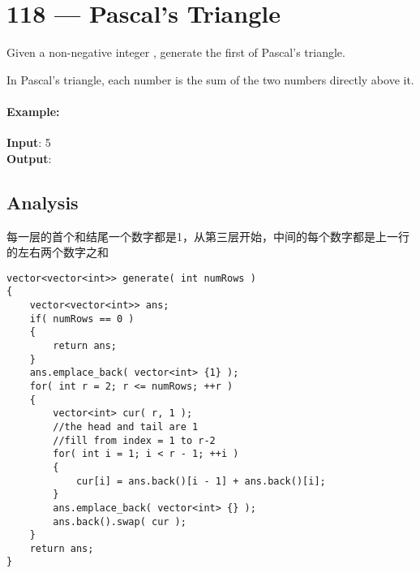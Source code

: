 \section{118 --- Pascal's Triangle}
Given a non-negative integer , generate the first  of Pascal's triangle.

In Pascal's triangle, each number is the sum of the two numbers directly above it.
\paragraph{Example:}
\begin{flushleft}
\textbf{Input}: 5
\\
\textbf{Output}:

\fcj{[[1], [1,1], [1,2,1], [1,3,3,1], [1,4,6,4,1]]}
\end{flushleft}
\subsection{Analysis}

每一层的首个和结尾一个数字都是1，从第三层开始，中间的每个数字都是上一行的左右两个数字之和

\setcounter{lstlisting}{0}
\begin{lstlisting}[style=customc, caption={DP}]
vector<vector<int>> generate( int numRows )
{
    vector<vector<int>> ans;
    if( numRows == 0 )
    {
        return ans;
    }
    ans.emplace_back( vector<int> {1} );
    for( int r = 2; r <= numRows; ++r )
    {
        vector<int> cur( r, 1 );
        //the head and tail are 1
        //fill from index = 1 to r-2
        for( int i = 1; i < r - 1; ++i )
        {
            cur[i] = ans.back()[i - 1] + ans.back()[i];
        }
        ans.emplace_back( vector<int> {} );
        ans.back().swap( cur );
    }
    return ans;
}
\end{lstlisting}
